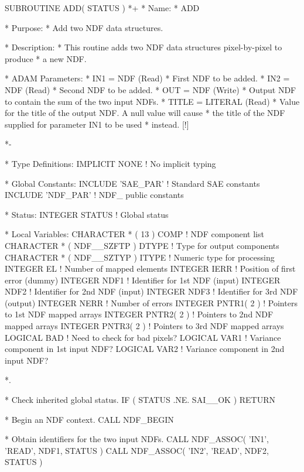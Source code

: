 \documentclass[twoside,11pt,nolof]{starlink}
\begin{document}
\small
\begin{terminalv}
      SUBROUTINE ADD( STATUS )
*+
*  Name:
*     ADD

*  Purpose:
*     Add two NDF data structures.

*  Description:
*     This routine adds two NDF data structures pixel-by-pixel to produce
*     a new NDF.

*  ADAM Parameters:
*     IN1 = NDF (Read)
*        First NDF to be added.
*     IN2 = NDF (Read)
*        Second NDF to be added.
*     OUT = NDF (Write)
*        Output NDF to contain the sum of the two input NDFs.
*     TITLE = LITERAL (Read)
*        Value for the title of the output NDF. A null value will cause
*        the title of the NDF supplied for parameter IN1 to be used
*        instead. [!]

*-

*  Type Definitions:
      IMPLICIT NONE              ! No implicit typing

*  Global Constants:
      INCLUDE 'SAE_PAR'          ! Standard SAE constants
      INCLUDE 'NDF_PAR'          ! NDF_ public constants

*  Status:
      INTEGER STATUS             ! Global status

*  Local Variables:
      CHARACTER * ( 13 ) COMP    ! NDF component list
      CHARACTER * ( NDF__SZFTP ) DTYPE ! Type for output components
      CHARACTER * ( NDF__SZTYP ) ITYPE ! Numeric type for processing
      INTEGER EL                 ! Number of mapped elements
      INTEGER IERR               ! Position of first error (dummy)
      INTEGER NDF1               ! Identifier for 1st NDF (input)
      INTEGER NDF2               ! Identifier for 2nd NDF (input)
      INTEGER NDF3               ! Identifier for 3rd NDF (output)
      INTEGER NERR               ! Number of errors
      INTEGER PNTR1( 2 )         ! Pointers to 1st NDF mapped arrays
      INTEGER PNTR2( 2 )         ! Pointers to 2nd NDF mapped arrays
      INTEGER PNTR3( 2 )         ! Pointers to 3rd NDF mapped arrays
      LOGICAL BAD                ! Need to check for bad pixels?
      LOGICAL VAR1               ! Variance component in 1st input NDF?
      LOGICAL VAR2               ! Variance component in 2nd input NDF?

*.

*  Check inherited global status.
      IF ( STATUS .NE. SAI__OK ) RETURN

*  Begin an NDF context.
      CALL NDF_BEGIN

*  Obtain identifiers for the two input NDFs.
      CALL NDF_ASSOC( 'IN1', 'READ', NDF1, STATUS )
      CALL NDF_ASSOC( 'IN2', 'READ', NDF2, STATUS )


\end{terminalv}
\end{document}
